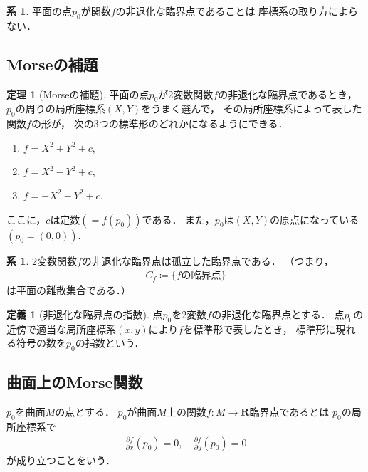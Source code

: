 \documentclass[11pt, a4paper, dvipdfmx]{jsarticle}
\theoremstyle{definition}
\newcommand{\rr}{\mathbf{R}}
\newcommand{\p}{\partial}
\theoremstyle{mystyle}
\newtheorem{DFN}[Axiom]{定義}
\newtheorem{THM}[Axiom]{定理}
\newtheorem{CRL}[Axiom]{系}
\numberwithin{equation}{section} %
\begin{document}
\begin{CRL}
    平面の点$p_0$が関数$f$の非退化な臨界点であることは
    座標系の取り方によらない．
\end{CRL}

\subsection{Morseの補題}

\begin{THM}[Morseの補題]
    平面の点$p_0$が2変数関数$f$の非退化な臨界点であるとき，
    $p_0$の周りの局所座標系$(X,Y)$をうまく選んで，
    その局所座標系によって表した関数$f$の形が，
    次の3つの標準形のどれかになるようにできる．
    \begin{enumerate}[label=(\roman*)]
        \item $f=X^2+Y^2+c$,
        \item $f=X^2-Y^2+c$,
        \item $f=-X^2-Y^2+c$.
    \end{enumerate}
    ここに，$c$は定数$(=f(p_0))$である．
    また，$p_0$は$(X,Y)$の原点になっている$(p_0=(0,0))$.
\end{THM}

\begin{CRL}
    2変数関数$f$の非退化な臨界点は孤立した臨界点である．
    （つまり，
    \begin{align*}
        C_f\coloneqq\{f\text{の臨界点}\}
    \end{align*}
    は平面の離散集合である．）
\end{CRL}

\begin{DFN}[非退化な臨界点の指数]
    点$p_0$を2変数$f$の非退化な臨界点とする．
    点$p_0$の近傍で適当な局所座標系$(x,y)$により$f$を標準形で表したとき，
    標準形に現れる符号の数を$p_0$の指数という．
\end{DFN}


\subsection{曲面上のMorse関数}


$p_0$を曲面$M$の点とする．
$p_0$が曲面$M$上の関数$f\colon M\to\rr$臨界点であるとは
$p_0$の局所座標系で
\begin{align}
    \frac{\p f}{\p x}(p_0)=0,\quad 
    \frac{\p f}{\p y}(p_0)=0
\end{align}
が成り立つことをいう．
\end{document}
